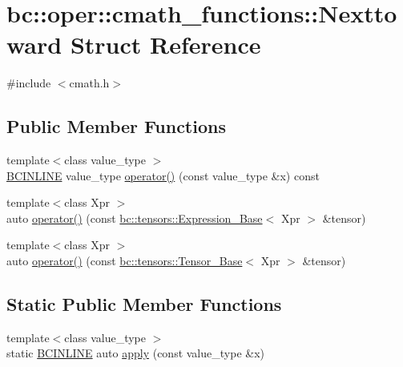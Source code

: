 \hypertarget{structbc_1_1oper_1_1cmath__functions_1_1Nexttoward}{}\section{bc\+:\+:oper\+:\+:cmath\+\_\+functions\+:\+:Nexttoward Struct Reference}
\label{structbc_1_1oper_1_1cmath__functions_1_1Nexttoward}


{\ttfamily \#include $<$cmath.\+h$>$}

\subsection*{Public Member Functions}
\begin{DoxyCompactItemize}
\item 
{\footnotesize template$<$class value\+\_\+type $>$ }\\\hyperlink{common_8h_a6699e8b0449da5c0fafb878e59c1d4b1}{B\+C\+I\+N\+L\+I\+NE} value\+\_\+type \hyperlink{structbc_1_1oper_1_1cmath__functions_1_1Nexttoward_a328f7b9ee1f514b5a34cb47fb2039232}{operator()} (const value\+\_\+type \&x) const
\item 
{\footnotesize template$<$class Xpr $>$ }\\auto \hyperlink{structbc_1_1oper_1_1cmath__functions_1_1Nexttoward_ae142532842ac9dabed9605a467c4ca22}{operator()} (const \hyperlink{classbc_1_1tensors_1_1Expression__Base}{bc\+::tensors\+::\+Expression\+\_\+\+Base}$<$ Xpr $>$ \&tensor)
\item 
{\footnotesize template$<$class Xpr $>$ }\\auto \hyperlink{structbc_1_1oper_1_1cmath__functions_1_1Nexttoward_a1b5747d5398cdd849b85538f09c56d5f}{operator()} (const \hyperlink{classbc_1_1tensors_1_1Tensor__Base}{bc\+::tensors\+::\+Tensor\+\_\+\+Base}$<$ Xpr $>$ \&tensor)
\end{DoxyCompactItemize}
\subsection*{Static Public Member Functions}
\begin{DoxyCompactItemize}
\item 
{\footnotesize template$<$class value\+\_\+type $>$ }\\static \hyperlink{common_8h_a6699e8b0449da5c0fafb878e59c1d4b1}{B\+C\+I\+N\+L\+I\+NE} auto \hyperlink{structbc_1_1oper_1_1cmath__functions_1_1Nexttoward_adf973a05d9af50a0144b11f26597647b}{apply} (const value\+\_\+type \&x)
\end{DoxyCompactItemize}


